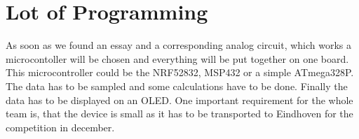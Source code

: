 \documentclass{report}
\begin{document}
\section{Lot of Programming}
As soon as we found an essay and a corresponding analog circuit, which works a microcontoller will be chosen and everything will be put together on one board. This microcontroller could be the NRF52832, MSP432 or a simple ATmega328P. The data has to be sampled and some calculations have to be done. Finally the data has to be displayed on an OLED. One important requirement for the whole team is, that the device is small as it has to be transported to Eindhoven for the competition in december.  

\printbibliography[heading=bibintoc]

\clearpage
{}
\setcounter{page}{\value{roman}}
\pagestyle{empty}
\appendix
\end{document}
